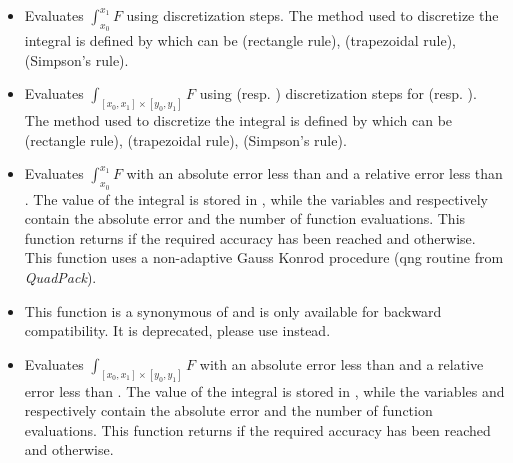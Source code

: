 \begin{itemize}
\item {}
  \sshortdescribe Evaluates $\int_{x_0}^{x_1} F$ using  discretization
  steps. The method used to discretize the integral is defined by 
  which can be  (rectangle rule),  (trapezoidal rule),
   (Simpson's rule).

\item {}
  \sshortdescribe Evaluates $\int_{[x_0, x_1] \times [y_0, y_1]} F$ using
   (resp. ) discretization steps for \var{[x0, x1]}
  (resp. \var{[y0, y1]}). The method used to discretize the integral is
  defined by  which can be  (rectangle rule),
   (trapezoidal rule),    (Simpson's rule).


\item {}
  \sshortdescribe Evaluates $\int_{x_0}^{x_1} F$ with an absolute error less
  than  and a relative error less than . The value of
  the integral is stored in , while the variables  and
   respectively contain the absolute error and the number of function
  evaluations. This function returns  if the required accuracy has been
  reached and  otherwise. This function uses a non-adaptive Gauss
  Konrod procedure (qng routine from {\it QuadPack}).

\item {}
    \sshortdescribe This function is a synonymous of
     and is only available for backward
    compatibility. It is deprecated, please use 
    instead. 

\item {}
  \sshortdescribe Evaluates $\int_{[x_0, x_1] \times [y_0, y_1]} F$ with an
  absolute error less than  and a relative error less than
  . The value of the integral is stored in , while the
  variables  and  respectively contain the absolute error
  and the number of function evaluations. This function returns  if the
  required accuracy has been reached and  otherwise.


\end{itemize}
